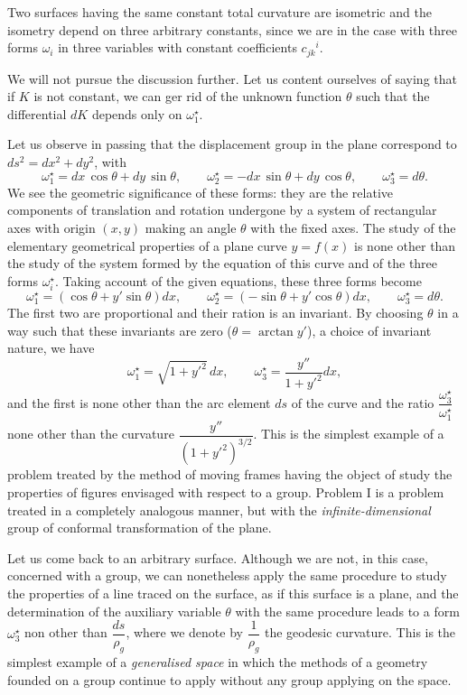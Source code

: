 \documentclass[leqno,11pt]{article}
\theoremstyle{shape1}
\theoremstyle{shape0}
\theoremstyle{shape2}
\theoremstyle{definition}
\begin{document}
Two surfaces having the same constant total curvature are isometric and the isometry depend on three arbitrary constants, since we are in the case with three forms $\omega_{i}$ in three variables with constant coefficients $c_{jk}{}^{i}$.

We will not pursue the discussion further. Let us content ourselves of saying that if $K$ is not constant, we can ger rid of the unknown function $\theta$ such that the differential $dK$ depends only on $\omega_{1}^{\star}$.

Let us observe in passing that the displacement group in the plane correspond to $ds^{2}=dx^{2}+dy^{2}$, with
\[
\omega_{1}^{\star}=dx\,\cos\theta+dy\,\sin\theta,\qquad\omega_{2}^{\star}=-dx\,\sin\theta+dy\,\cos\theta,\qquad\omega_{3}^{\star}=d\theta.
\]
We see the geometric significance of these forms: they are the relative components of translation and rotation undergone by a system of rectangular axes with origin $(x,y)$ making an angle $\theta$ with the fixed axes. The study of the elementary geometrical properties of a plane curve $y=f(x)$ is none other than the study of the system formed by the equation of this curve and of the three forms $\omega_{i}^{\star}$. Taking account of the given equations, these three forms become
\[
\omega_{1}^{\star}=(\cos\theta+y'\sin\theta)dx,\qquad\omega_{2}^{\star}=(-\sin\theta+y'\cos\theta)dx,\qquad\omega_{3}^{\star}=d\theta.
\]
The first two are proportional and their ration is an invariant. By choosing $\theta$ in a way such that these invariants are zero ($\theta=\arctan y'$), a choice of invariant nature, we have
\[
\omega_{1}^{\star}=\sqrt{1+y'^{2}}\,dx,\qquad\omega_{3}^{\star}=\frac{y''}{1+y'^{2}}dx,
\]
and the first is none other than the arc element $ds$ of the curve and the ratio $\dfrac{\omega_{3}^{\star}}{\omega_{1}^{\star}}$ none other than the curvature $\dfrac{y''}{(1+y'^{2})^{3/2}}$. This is the simplest example of a problem treated by the method of moving frames having the object of study the properties of figures envisaged with respect to a group. Problem I is a problem treated in a completely analogous manner, but with the \emph{infinite-dimensional} group of conformal transformation of the plane.

Let us come back to an arbitrary surface. Although we are not, in this case, concerned with a group, we can nonetheless apply the same procedure to study the properties of a line traced on the surface, as if this surface is a plane, and the determination of the auxiliary variable $\theta$ with the same procedure leads to a form $\omega_{3}^{\star}$ non other than $\dfrac{ds}{\rho_{g}}$, where we denote by $\dfrac{1}{\rho_{g}}$ the geodesic curvature. This is the simplest example of a \emph{generalised space} in which the methods of a geometry founded on a group continue to apply without any group applying on the space.
\end{document}
